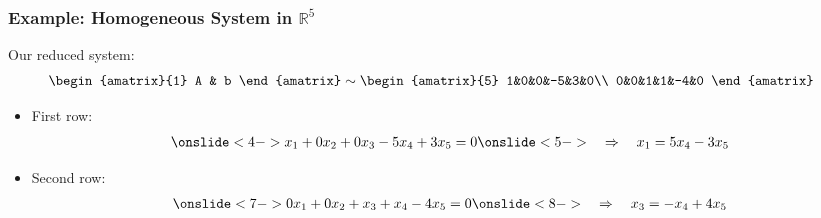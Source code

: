 \begin{frame}
\frametitle{Example: Homogeneous System in $\mathbb{R}^5$}
Our reduced system:
\begin{align*}
    \begin{amatrix}{1}
    A & b
\end{amatrix}
& \sim 
\begin{amatrix}{5}
    1&0&0&-5&3&0\\
    0&0&1&1&-4&0
\end{amatrix}
\end{align*}

\begin{itemize}
    \item<3-> First row: \begin{align*}
        \onslide<4->{x_1+0x_2 + 0x_3-5x_4+3x_5 =0}\onslide<5->{\quad \Rightarrow \quad x_1 = 5x_4-3x_5}
    \end{align*}
    \item<6-> Second row: \begin{align*}
        \onslide<7->{0x_1+0x_2 + x_3 + x_4 -4x_5 =0}\onslide<8->{\quad \Rightarrow \quad x_3 = - x_4 + 4x_5}
    \end{align*}    
\end{itemize}
\end{frame}

